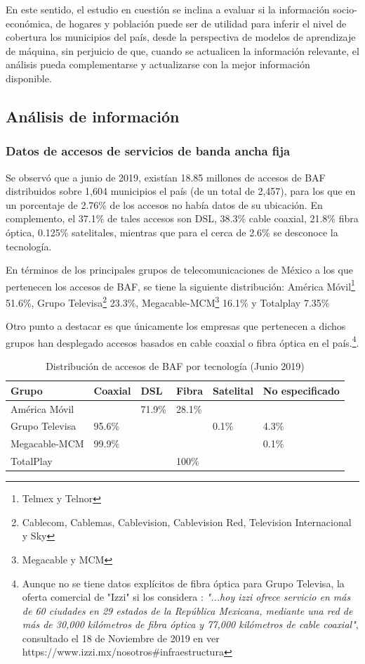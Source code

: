 \documentclass[9pt,twocolumn,twoside]{ilcss}
\begin{document}
En este sentido, el estudio en cuestión se inclina a evaluar si la información socio-económica, de hogares y población puede ser de utilidad para inferir el nivel de cobertura los municipios del país, desde la perspectiva de modelos de aprendizaje de máquina, sin perjuicio de que, cuando se actualicen la información relevante, el análisis pueda complementarse y actualizarse con la mejor información disponible.

\subsection{Análisis de información}

\subsubsection{Datos de accesos de servicios de banda ancha fija}
Se observó que a junio de 2019, existían 18.85 millones de accesos de BAF distribuidos sobre 1,604 municipios el país (de un total de 2,457), para los que en un porcentaje de 2.76\% de los accesos no había datos de su ubicación. En complemento, el 37.1\% de tales accesos son DSL, 38.3\% cable coaxial, 21.8\% fibra óptica, 0.125\% satelitales, mientras que para el cerca de 2.6\% se desconoce la tecnología.

En términos de los principales grupos de telecomunicaciones de México a los que pertenecen los accesos de BAF, se tiene la siguiente distribución: América Móvil\footnote{Telmex y Telnor}  51.6\%, Grupo Televisa\footnote{Cablecom, Cablemas, Cablevision, Cablevision Red, Television Internacional y Sky} 23.3\%, Megacable-MCM\footnote{Megacable y MCM}  16.1\% y Totalplay 7.35\%  

Otro punto a destacar es que únicamente los empresas que pertenecen a dichos grupos han desplegado accesos basados en cable coaxial o fibra óptica en el país.\footnote{Aunque no se tiene datos explícitos de fibra óptica para Grupo Televisa, la oferta comercial de "Izzi" si los considera
	: \emph{"...hoy izzi ofrece servicio en más de 60 ciudades en 29 estados de la República Mexicana, mediante una red de más de 30,000 kilómetros de fibra óptica y 77,000 kilómetros de cable coaxial"}, consultado el 18 de Noviembre de 2019 en 
	ver https://www.izzi.mx/nosotros\#infraestructura}.

\begin{table}[tbhp]
 \centering
	\caption{Distribución de accesos de BAF por tecnología (Junio 2019)\label{table:distribaccesosgrupos}}
	\begin{tabular}{@{}llllll@{}}
		\toprule
		Grupo & Coaxial & DSL & Fibra & Satelital & No especificado \\ \midrule
		América Móvil &  & 71.9\% & 28.1\% &  &  \\ 
		Grupo Televisa & 95.6\% &  &  & 0.1\% & 4.3\% \\ 
		Megacable-MCM & 99.9\% &  &  &  & 0.1\% \\ 
		TotalPlay &  &  & 100\% &  &  \\ \bottomrule
	\end{tabular}
\end{table}
\end{document}
